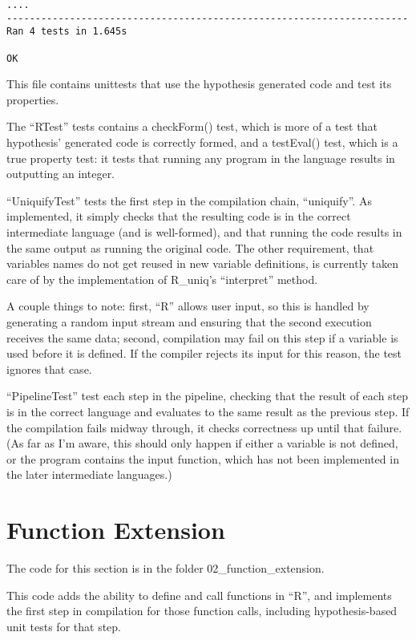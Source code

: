 \documentclass[11pt, oneside]{article}   	%
\begin{document}
\begin{lstlisting}
....
----------------------------------------------------------------------
Ran 4 tests in 1.645s

OK
\end{lstlisting}

This file contains unittests that use the hypothesis generated code and test its properties.

The ``RTest'' tests contains a checkForm() test, which is more of a test that hypothesis' generated code is correctly formed, and a testEval() test, which is a true property test: it tests that running any program in the language results in outputting an integer.

``UniquifyTest'' tests the first step in the compilation chain, ``uniquify''. As implemented, it simply checks that the resulting code is in the correct intermediate language (and is well-formed), and that running the code results in the same output as running the original code. The other requirement, that variables names do not get reused in new variable definitions, is currently taken care of by the implementation of R\_uniq's ``interpret'' method.

A couple things to note: first, ``R'' allows user input, so this is handled by generating a random input stream and ensuring that the second execution receives the same data; second, compilation may fail on this step if a variable is used before it is defined. If the compiler rejects its input for this reason, the test ignores that case.

``PipelineTest'' test each step in the pipeline, checking that the result of each step is in the correct language and evaluates to the same result as the previous step. If the compilation fails midway through, it checks correctness up until that failure. (As far as I'm aware, this should only happen if either a variable is not defined, or the program contains the input function, which has not been implemented in the later intermediate languages.)

\section{Function Extension}
The code for this section is in the folder {02\_function\_extension}.

This code adds the ability to define and call functions in ``R'', and implements the first step in compilation for those function calls, including hypothesis-based unit tests for that step.
\end{document}
